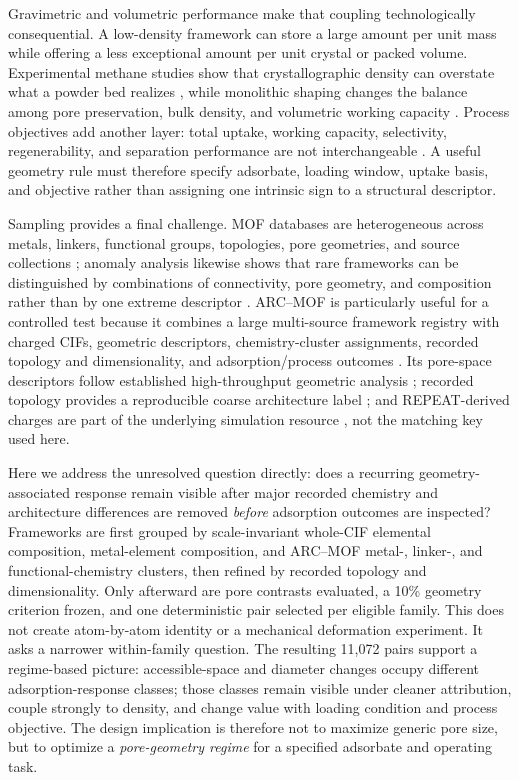 \documentclass[11pt,a4paper]{article}
\begin{document}
Gravimetric and volumetric performance make that coupling technologically
consequential. A low-density framework can store a large amount per unit mass while
offering a less exceptional amount per unit crystal or packed volume. Experimental
methane studies show that crystallographic density can overstate what a powder bed
realizes \cite{korman2020lowpressure}, while monolithic shaping changes the balance
among pore preservation, bulk density, and volumetric working capacity
\cite{connolly2019monolith}. Process objectives add another layer: total uptake,
working capacity, selectivity, regenerability, and separation performance are not
interchangeable \cite{altintas2018co2database}. A useful geometry rule must
therefore specify adsorbate, loading window, uptake basis, and objective rather than
assigning one intrinsic sign to a structural descriptor.

Sampling provides a final challenge. MOF databases are heterogeneous across
metals, linkers, functional groups, topologies, pore geometries, and source
collections \cite{moosavi2020ecosystem}; anomaly analysis likewise shows that rare
frameworks can be distinguished by combinations of connectivity, pore geometry,
and composition rather than by one extreme descriptor
\cite{alimardani2026anomaly}. ARC--MOF is particularly useful for a controlled
test because it combines a large multi-source framework registry with charged CIFs,
geometric descriptors, chemistry-cluster assignments, recorded topology and
dimensionality, and adsorption/process outcomes \cite{burner2023arcmof}. Its
pore-space descriptors follow established high-throughput geometric analysis
\cite{willems2012zeopp}; recorded topology provides a reproducible coarse
architecture label \cite{zoubritzky2022crystalnets}; and REPEAT-derived charges are
part of the underlying simulation resource \cite{campana2009repeat}, not the
matching key used here.

Here we address the unresolved question directly: does a recurring
geometry-associated response remain visible after major recorded chemistry and
architecture differences are removed \emph{before} adsorption outcomes are
inspected? Frameworks are first grouped by scale-invariant whole-CIF elemental
composition, metal-element composition, and ARC--MOF metal-, linker-, and
functional-chemistry clusters, then refined by recorded topology and dimensionality.
Only afterward are pore contrasts evaluated, a 10\% geometry criterion frozen, and
one deterministic pair selected per eligible family. This does not create
atom-by-atom identity or a mechanical deformation experiment. It asks a narrower
within-family question. The resulting 11,072 pairs support a regime-based picture:
accessible-space and diameter changes occupy different adsorption-response classes;
those classes remain visible under cleaner attribution, couple strongly to density,
and change value with loading condition and process objective. The design
implication is therefore not to maximize generic pore size, but to optimize a
\emph{pore-geometry regime} for a specified adsorbate and operating task.
\end{document}
